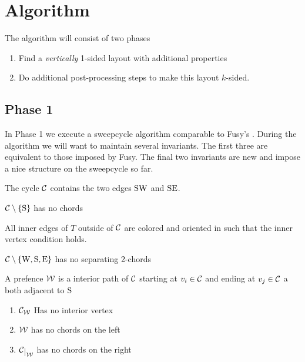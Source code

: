 

\section{Algorithm}
  The algorithm will consist of two phases

  \begin{enumerate}
    \item Find a \emph{vertically} 1-sided layout with additional properties
    \item Do additional post-processing steps to make this layout $k$-sided.
  \end{enumerate}

\subsection{Phase 1}
  In Phase 1 we execute a sweepcycle algorithm comparable to Fusy's \cite{Fusy2006}.
  During the algorithm we will want to maintain several invariants. The first three are equivalent to those imposed by Fusy. The final two invariants are new and impose a nice structure on the sweepcycle so far.

  \begin{invariants}
    \itemsep=-4pt

    \item \label{i:uni:SWandSE} The cycle $\mathcal{C}$ contains the two edges $\mathrm{S} \mathrm{W}$ and $\mathrm{S} \mathrm{E}$.
    \item \label{i:uni:noChords} $\mathcal{C} \setminus \left\lbrace {\mathrm{S}} \right\rbrace$ has no chords
    \item \label{i:uni:intVertCond} All inner edges of $T$ outside of $\mathcal{C}$ are colored and oriented in such that the inner vertex condition holds. %
    \item \label{i:uni:no2Chords} $\mathcal{C}\setminus \left\lbrace {\mathrm{W}, \mathrm{S}, \mathrm{E}} \right\rbrace$ has no separating 2-chords
  \end{invariants}


  \begin{defi}[Prefence]
  A prefence $\mathcal{W}$ is a interior path of $\mathcal{C}$ starting at $v_i \in \mathcal{C}$ and ending at $v_j \in \mathcal{C}$ a both adjacent to $\mathrm{S}$
  \begin{enumerate}
    \itemsep=-4pt
    \renewcommand*{\labelenumi}{(P\arabic{enumi})}%
    \renewcommand*{\theenumi}{(P\arabic{enumi})}%

    \item  $\mathcal{C}_{\mathcal{W}}$ Has no interior vertex
    \label{p:noInteriorVertex}
    \item  $\mathcal{W}$ has no chords on the left     \label{p:Wchordfree}
    \item  $\restC{\W}$ has no chords on the right     \label{p:Cchordfree}
  \end{enumerate}
  \end{defi}


